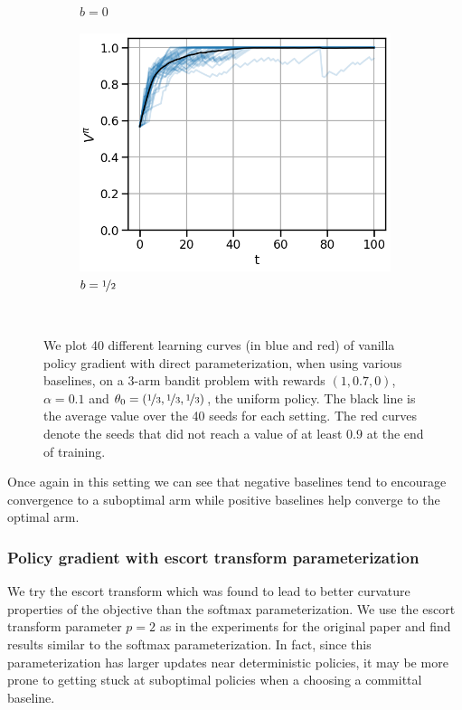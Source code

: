 \begin{figure}[!ht]
\begin{subfigure}[b]{0.326\linewidth}
    \caption{$b = 0$}
  \end{subfigure}
  \begin{subfigure}[b]{0.326\linewidth}
    \includegraphics[width=\textwidth]{articles/baselines/figs/appendix_figs_3arm_000/vanilla_fixed_05_eta=01.png}
    \caption{$b = \nicefrac{1}{2}$}
  \end{subfigure}
  \caption{We plot 40 different learning curves (in blue and red) of vanilla policy gradient with direct parameterization, when using various baselines, on a 3-arm bandit problem with rewards $(1, 0.7, 0)$, $\alpha = 0.1$ and $\theta_0 = (\nicefrac{1}{3}, \nicefrac{1}{3}, \nicefrac{1}{3})$, the uniform policy. The black line is the average value over the 40 seeds for each setting. The red curves denote the seeds that did not reach a value of at least $0.9$ at the end of training.}~\label{appfig:learning_curves_dpg_035}
\end{figure}

Once again in this setting we can see that negative baselines tend to encourage convergence to a suboptimal arm while positive baselines help converge to the optimal arm.



\subsubsection*{Policy gradient with escort transform parameterization}

We try the escort transform \cite{mei2020escaping} which was found to lead to better curvature properties of the objective than the softmax parameterization. We use the escort transform parameter $p=2$ as in the experiments for the original paper and find results similar to the softmax parameterization.
In fact, since this parameterization has larger updates near deterministic policies, it may be more prone to getting stuck at suboptimal policies when a choosing a committal baseline.

